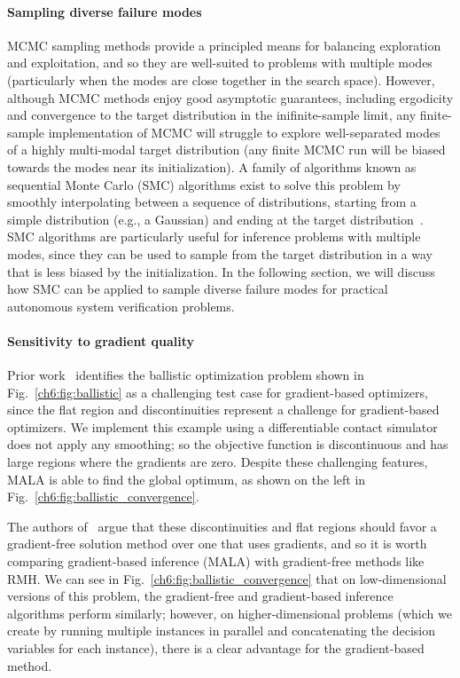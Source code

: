 \paragraph{Sampling diverse failure modes} MCMC sampling methods provide a principled means for balancing exploration and exploitation, and so they are well-suited to problems with multiple modes (particularly when the modes are close together in the search space). However, although MCMC methods enjoy good asymptotic guarantees, including ergodicity and convergence to the target distribution in the inifinite-sample limit, any finite-sample implementation of MCMC will struggle to explore well-separated modes of a highly multi-modal target distribution (any finite MCMC run will be biased towards the modes near its initialization). A family of algorithms known as sequential Monte Carlo (SMC) algorithms exist to solve this problem by smoothly interpolating between a sequence of distributions, starting from a simple distribution (e.g., a Gaussian) and ending at the target distribution~\cite{chopinIntroductionSequentialMonte2020}. SMC algorithms are particularly useful for inference problems with multiple modes, since they can be used to sample from the target distribution in a way that is less biased by the initialization. In the following section, we will discuss how SMC can be applied to sample diverse failure modes for practical autonomous system verification problems.

\paragraph{Sensitivity to gradient quality} Prior work~\cite{suhDifferentiableSimulatorsGive2022a} identifies the ballistic optimization problem shown in Fig.~\ref{ch6:fig:ballistic} as a challenging test case for gradient-based optimizers, since the flat region and discontinuities represent a challenge for gradient-based optimizers. We implement this example using a differentiable contact simulator does not apply any smoothing; so the objective function is discontinuous and has large regions where the gradients are zero. Despite these challenging features, MALA is able to find the global optimum, as shown on the left in Fig.~\ref{ch6:fig:ballistic_convergence}.

The authors of~\cite{suhDifferentiableSimulatorsGive2022a} argue that these discontinuities and flat regions should favor a gradient-free solution method over one that uses gradients, and so it is worth comparing gradient-based inference (MALA) with gradient-free methods like RMH. We can see in Fig.~\ref{ch6:fig:ballistic_convergence} that on low-dimensional versions of this problem, the gradient-free and gradient-based inference algorithms perform similarly; however, on higher-dimensional problems (which we create by running multiple instances in parallel and concatenating the decision variables for each instance), there is a clear advantage for the gradient-based method.

